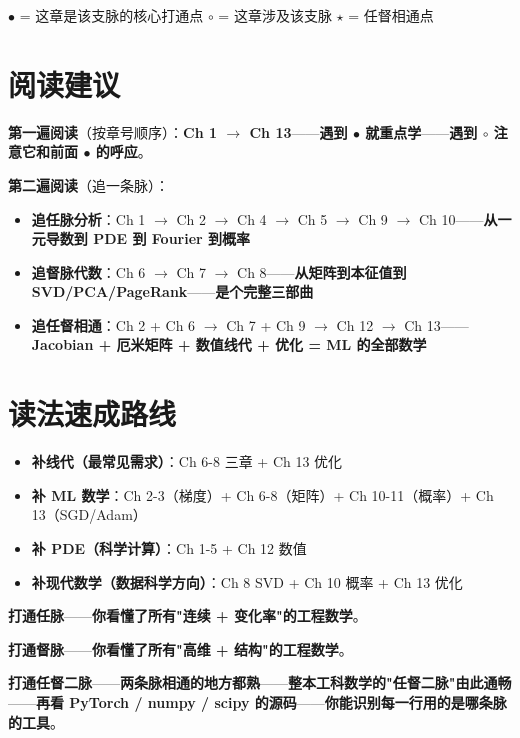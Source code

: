 \begin{center}
\footnotesize
\textbf{$\bullet$} = 这章是该支脉的核心打通点 \qquad
$\circ$ = 这章涉及该支脉 \qquad
$\star$ = 任督相通点
\end{center}

\section*{阅读建议}

\textbf{第一遍阅读}（按章号顺序）：\textbf{Ch 1 $\to$ Ch 13}——\textbf{遇到 $\bullet$ 就重点学}——\textbf{遇到 $\circ$ 注意它和前面 $\bullet$ 的呼应}。

\textbf{第二遍阅读}（追一条脉）：

\begin{itemize}
\item \textbf{追任脉分析}：Ch 1 $\to$ Ch 2 $\to$ Ch 4 $\to$ Ch 5 $\to$ Ch 9 $\to$ Ch 10——\textbf{从一元导数到 PDE 到 Fourier 到概率}
\item \textbf{追督脉代数}：Ch 6 $\to$ Ch 7 $\to$ Ch 8——\textbf{从矩阵到本征值到 SVD/PCA/PageRank}——\textbf{是个完整三部曲}
\item \textbf{追任督相通}：Ch 2 + Ch 6 $\to$ Ch 7 + Ch 9 $\to$ Ch 12 $\to$ Ch 13——\textbf{Jacobian + 厄米矩阵 + 数值线代 + 优化 = ML 的全部数学}
\end{itemize}

\section*{读法速成路线}

\begin{itemize}
\item \textbf{补线代（最常见需求）}：Ch 6-8 三章 + Ch 13 优化
\item \textbf{补 ML 数学}：Ch 2-3（梯度）+ Ch 6-8（矩阵）+ Ch 10-11（概率）+ Ch 13（SGD/Adam）
\item \textbf{补 PDE（科学计算）}：Ch 1-5 + Ch 12 数值
\item \textbf{补现代数学（数据科学方向）}：Ch 8 SVD + Ch 10 概率 + Ch 13 优化
\end{itemize}

\vspace{0.5cm}

\textbf{打通任脉}——\textbf{你看懂了所有"连续 + 变化率"的工程数学}。

\textbf{打通督脉}——\textbf{你看懂了所有"高维 + 结构"的工程数学}。

\textbf{打通任督二脉}——\textbf{两条脉相通的地方都熟}——\textbf{整本工科数学的"任督二脉"由此通畅}——\textbf{再看 PyTorch / numpy / scipy 的源码}——\textbf{你能识别每一行用的是哪条脉的工具}。

\clearpage
